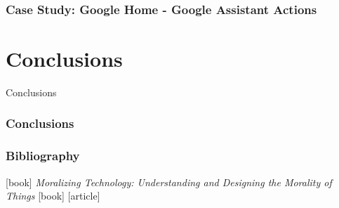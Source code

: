 \documentclass{beamer}
\begin{document}
\begin{frame}
\frametitle{Case Study: Google Home - Google Assistant Actions}



\end{frame}

\section{Conclusions}

\begin{frame}
\begin{center} 
	 Conclusions
\end{center}
\end{frame}

\begin{frame}
\frametitle{Conclusions}
\end{frame}

\begin{frame}
\frametitle{Bibliography}
\begin{thebibliography}{9}
	[book]
	\textit{Moralizing Technology: Understanding and Designing the Morality of Things}
	[book]
	[article]

\end{thebibliography}
\end{frame}
\end{document}

